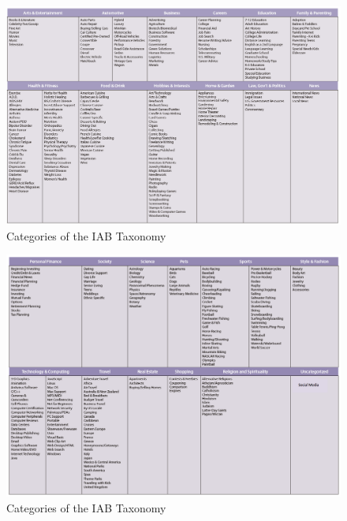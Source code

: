 \documentclass[english,a4paper]{ifimaster}
\begin{document}
%
\begin{figure}[H]
\centering
\includegraphics[width=1\textwidth]{IAB/Taxonomy-1.png}
\caption{Categories of the IAB Taxonomy}
\label{fig:IAB1}
\end{figure}
\begin{figure}[H]
\centering
\includegraphics[width=1\textwidth]{IAB/Taxonomy-2.png}
\caption{Categories of the IAB Taxonomy}
\label{fig:IAB2}
\end{figure}
\end{document}
